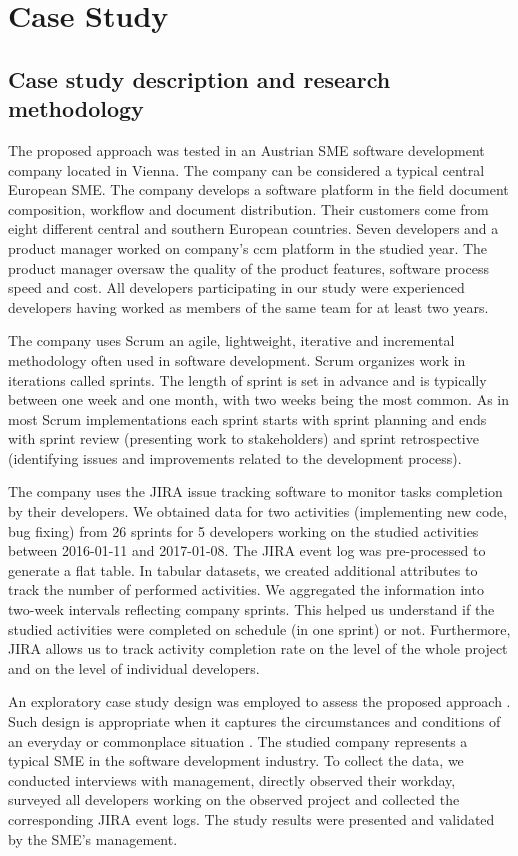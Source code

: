 \section{Case Study}

\subsection{Case study description and research methodology}
The proposed approach was tested in an Austrian SME software development company located in Vienna. The company can be considered a typical central European SME. The company develops a software platform in the field document composition, workflow and document distribution. Their customers come from eight different central and southern European countries. Seven developers and a product manager worked on company's \gls{ccm} platform in the studied year. The product manager oversaw the quality of the product features, software process speed and cost. All developers participating in our study were experienced developers having worked as members of the same team for at least two years.

The company uses Scrum \citep{takeuchi1986new} an agile, lightweight, iterative and incremental methodology often used in software development. Scrum organizes work in iterations called sprints. The length of sprint is set in advance and is typically between one week and one month, with two weeks being the most common. As in most Scrum implementations each sprint starts with sprint planning and ends with sprint review (presenting work to stakeholders) and sprint retrospective (identifying issues and improvements related to the development process). 

The company uses the JIRA issue tracking software to monitor tasks completion by their developers. We obtained data for two activities (implementing new code, bug fixing) from 26 sprints for 5 developers working on the studied activities between 2016-01-11 and 2017-01-08. The JIRA event log was pre-processed to generate a flat table. In tabular datasets, we created additional attributes to track the number of performed activities. We aggregated the information into two-week intervals reflecting company sprints. This helped us understand if the studied activities were completed on schedule (in one sprint) or not. Furthermore, JIRA allows us to track activity completion rate on the level of the whole project and on the level of individual developers. 

An exploratory case study design was employed to assess the proposed approach \citep{DBLP:journals/ese/RunesonH09}. Such design is appropriate when it captures the circumstances and conditions of an everyday or commonplace situation \citep{yin2009case}. The studied company represents a typical SME in the software development industry. To collect the data, we conducted interviews with management, directly observed their workday, surveyed all developers working on the observed project and collected the corresponding JIRA event logs. The study results were presented and validated by the SME’s management.

